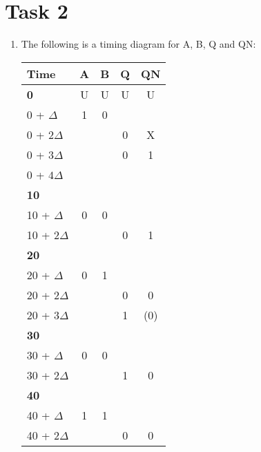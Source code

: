 \documentclass[a4paper,11pt,norsk]{article}
\begin{document}
\section*{Task 2}
\begin{enumerate}
\item The following is a timing diagram for A, B, Q and QN:
\begin{table}[H]
    \centering
    \begin{tabular}{|l|c|c|c|c|}
        \hline
        Time & \textbf{A} & \textbf{B} & \textbf{Q} & \textbf{QN} \\
        \hline
        \textbf{0}          & U     & U     & U     & U     \\
        0 + $\Delta$        & 1     & 0     &       &       \\
        0 + $2\Delta$       &       &       & 0     & X     \\
        0 + $3\Delta$       &       &       & 0     & 1     \\
        0 + $4\Delta$       &       &       &       &       \\
        \textbf{10}         &       &       &       &       \\
        10 + $\Delta$       & 0     & 0     &       &       \\
        10 + $2\Delta$      &       &       & 0     & 1     \\
        \textbf{20}         &       &       &       &       \\
        20 + $\Delta$       & 0     & 1     &       &       \\
        20 + $2\Delta$      &       &       & 0     & 0     \\
        20 + $3\Delta$      &       &       & 1     & (0)   \\
        \textbf{30}         &       &       &       &       \\
        30 + $\Delta$       & 0     & 0     &       &       \\
        30 + $2\Delta$      &       &       & 1     & 0     \\
        \textbf{40}         &       &       &       &       \\
        40 + $\Delta$       & 1     & 1     &       &       \\
        40 + $2\Delta$      &       &       & 0     & 0     \\
        \hline
    \end{tabular}
\end{table}


\end{enumerate}
\end{document}
